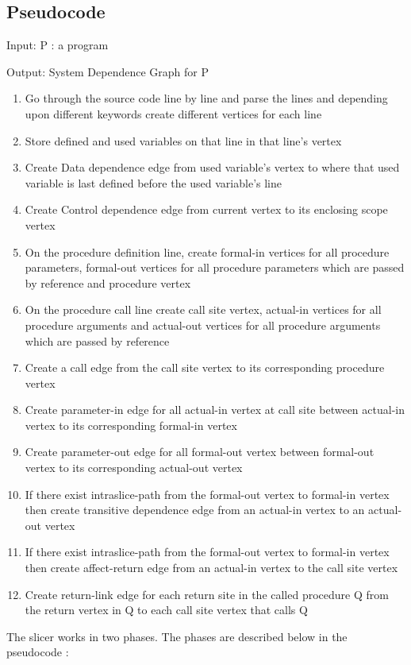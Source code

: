 \documentclass[conference]{IEEEtran}
\begin{document}
\subsection{Pseudocode}
Input: P : a program

Output: System Dependence Graph for P
\begin{enumerate}
    \item Go through the source code line by line and parse the lines and depending upon different keywords create different vertices for each line
    \item Store defined and used variables on that line in that line’s vertex
    \item Create Data dependence edge from used variable’s vertex to where that used variable is last deﬁned before the used variable’s line
\item Create Control dependence edge from current vertex to its enclosing scope vertex
\item On the procedure definition line, create formal-in vertices for all procedure parameters, formal-out vertices for all procedure parameters which are passed by reference and procedure vertex
\item On the procedure call line create call site vertex, actual-in vertices for all procedure arguments and actual-out vertices for all procedure arguments which are passed by reference
\item Create a call edge from the call site vertex to its corresponding procedure vertex
\item Create parameter-in edge for all actual-in vertex at call site between actual-in vertex to its corresponding formal-in vertex
\item	Create parameter-out edge for all formal-out vertex between formal-out vertex to its corresponding actual-out vertex
\item	If there exist intraslice-path from the formal-out vertex to formal-in vertex then create transitive dependence edge from an actual-in vertex to an actual-out vertex 
\item If there exist intraslice-path from the formal-out vertex to formal-in vertex then create affect-return edge from an actual-in vertex to the call site vertex 
\item Create return-link edge for each return site in the called procedure Q from the return vertex in Q to each call site vertex that calls Q
\end{enumerate}
The slicer works in two phases. The phases are described below in the pseudocode :
\end{document}
